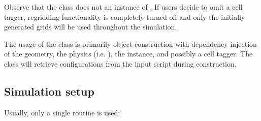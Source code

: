 \documentclass[letterpaper,10pt,english]{sphinxmanual}
\begin{document}
\begin{sphinxVerbatim}[commandchars=\\\{\},formatcom=\scriptsize]
  
                   
                       
                      
                    
\end{sphinxVerbatim}

\sphinxAtStartPar
Observe that the  class does not  an instance of {\hyperref[\detokenize{Source/CellTagger:chap-celltagger}]{}}.
If users decide to omit a cell tagger, regridding functionality is completely turned off and only the initially generated grids will be used throughout the simulation.

\sphinxAtStartPar
The usage of the  class is primarily object construction with dependency injection of the geometry, the physics (i.e. ), the  instance, and possibly a cell tagger.
The  class will retrieve configurations from the input script during construction.


\subsection{Simulation setup}
\label{\detokenize{Source/Driver:simulation-setup}}
\sphinxAtStartPar
Usually, only a single routine is used:
\end{document}
